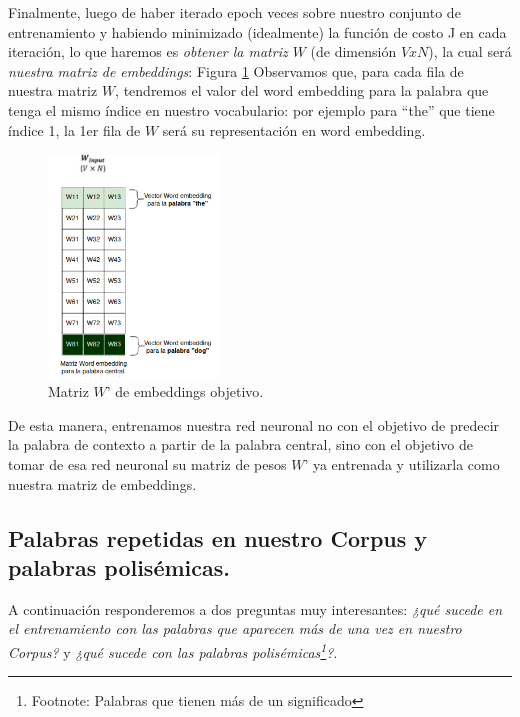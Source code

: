 \documentclass[12pt,a4paper]{article}
\begin{document}
\begin{sloppypar}
\begin{enumerate}
\end{enumerate}
      
Finalmente, luego de haber iterado epoch veces sobre nuestro conjunto de entrenamiento y habiendo minimizado (idealmente) la función de costo J en cada iteración, lo que haremos es \textit{obtener la matriz $W$} (de dimensión $V x N$), la cual será \textit{nuestra matriz de embeddings}: Figura \ref{fig:9_EjSkip} Observamos que, para cada fila de nuestra matriz $W$, tendremos el valor del word embedding para la palabra que tenga el mismo índice en nuestro vocabulario: por ejemplo para “the” que tiene índice 1, la 1er fila de $W$ será su representación en word embedding.

\begin{figure}[H]    %
\centering
\includegraphics[width=0.4\textwidth]{images/Ejemplo_Skipgram/9_EjSkip.png}
\caption{Matriz $W’$ de embeddings objetivo.} 
\label{fig:9_EjSkip}
\end{figure}

De esta manera, entrenamos nuestra red neuronal no con el objetivo de predecir la palabra de contexto a partir de la palabra central, sino con el objetivo de tomar de esa red neuronal su matriz de pesos $W’$ ya entrenada y utilizarla como nuestra matriz de embeddings.

\cleardoublepage

\subsection{Palabras repetidas en nuestro Corpus y palabras polisémicas.}\label{anexo_polisem}

A continuación responderemos a dos preguntas muy interesantes: \textit{¿qué sucede en el entrenamiento con las palabras que aparecen más de una vez en nuestro Corpus?} y \textit{¿qué sucede con las palabras polisémicas\footnote{Footnote: Palabras que tienen más de un significado}?}.


\end{sloppypar}
\end{document}
